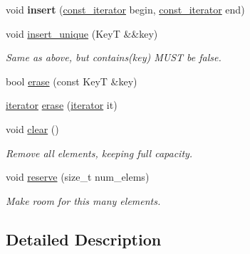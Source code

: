 \begin{DoxyCompactItemize}
\item 
\hypertarget{classemlib_1_1_hash_set_a12f1684fe36b5490b72973220e709faf}{void {\bfseries insert} (\hyperlink{classemlib_1_1_hash_set_1_1const__iterator}{const\+\_\+iterator} begin, \hyperlink{classemlib_1_1_hash_set_1_1const__iterator}{const\+\_\+iterator} end)}\label{classemlib_1_1_hash_set_a12f1684fe36b5490b72973220e709faf}

\item 
\hypertarget{classemlib_1_1_hash_set_adfb2429d65f06e26204135132adf5613}{void \hyperlink{classemlib_1_1_hash_set_adfb2429d65f06e26204135132adf5613}{insert\+\_\+unique} (Key\+T \&\&key)}\label{classemlib_1_1_hash_set_adfb2429d65f06e26204135132adf5613}

\begin{DoxyCompactList}\small\item\em Same as above, but contains(key) M\+U\+S\+T be false. \end{DoxyCompactList}\item 
bool \hyperlink{classemlib_1_1_hash_set_ae1ad3bfd5f24872029d64a965b60e550}{erase} (const Key\+T \&key)
\item 
\hyperlink{classemlib_1_1_hash_set_1_1iterator}{iterator} \hyperlink{classemlib_1_1_hash_set_a2dfce788bbbdbabf3b7e3aeae3357fc9}{erase} (\hyperlink{classemlib_1_1_hash_set_1_1iterator}{iterator} it)
\item 
\hypertarget{classemlib_1_1_hash_set_a226f08848b957f488bc996670d3ee3b1}{void \hyperlink{classemlib_1_1_hash_set_a226f08848b957f488bc996670d3ee3b1}{clear} ()}\label{classemlib_1_1_hash_set_a226f08848b957f488bc996670d3ee3b1}

\begin{DoxyCompactList}\small\item\em Remove all elements, keeping full capacity. \end{DoxyCompactList}\item 
\hypertarget{classemlib_1_1_hash_set_a120a1bbfd5e0af28f086f210b76f9b20}{void \hyperlink{classemlib_1_1_hash_set_a120a1bbfd5e0af28f086f210b76f9b20}{reserve} (size\+\_\+t num\+\_\+elems)}\label{classemlib_1_1_hash_set_a120a1bbfd5e0af28f086f210b76f9b20}

\begin{DoxyCompactList}\small\item\em Make room for this many elements. \end{DoxyCompactList}\end{DoxyCompactItemize}


\subsection{Detailed Description}
